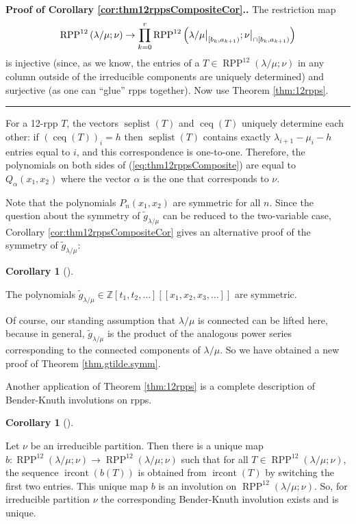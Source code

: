 \documentclass[numbers=enddot,12pt,final,onecolumn,notitlepage]{scrartcl}%
\theoremstyle{definition}
\newtheorem{coro}[theo]{Corollary}
\newenvironment{corollary}[1][]
{\begin{coro}[#1]\begin{leftbar}}
{\end{leftbar}\end{coro}}
\newenvironment{proof}[1][Proof]{\noindent\textbf{#1.} }{\ \rule{0.5em}{0.5em}}
\newcommand{\kk}{\mathbf{k}}
\let\prodnonlimits\prod
\renewcommand{\prod}{\prodnonlimits\limits}
\def\seplist{{\operatorname{seplist}}} %
\def\ceq{{\operatorname{ceq}}}
\def\ircont{{\operatorname{ircont}}}
\def\ceqvar{{{\alpha}}} %
\def\seplistvar{{{\nu}}} %
\def\g{{\widetilde{g}}}
\def\lm{{\lambda/\mu}}
\def\Z{{\mathbb{Z}}}
\def\OneTwoRPPCutvar{{\operatorname{RPP}^{12}\left(  \lambda/\mu ;\seplistvar \right)}}
\begin{document}
\begin{proof}[Proof of Corollary \ref{cor:thm12rppsCompositeCor}.] The restriction map
\[
\OneTwoRPPCutvar \to \prod_{k=0}^r \operatorname{RPP}^{12}\left( \lm\big|_{[b_k,a_{k+1})} ; \nuxycap{b_k}{a_{k+1}}\right)
\]
is injective (since, as we know, the entries of a $T \in \OneTwoRPPCutvar$ in any column outside of the irreducible components are uniquely determined) and surjective (as one can ``glue'' rpps together).
Now use Theorem \ref{thm:12rpps}.
\end{proof}

 For a 12-rpp $T$, the vectors $\seplist(T)$ and $\ceq(T)$ uniquely determine each other: if $(\ceq(T))_i=h$ then $\seplist(T)$ contains exactly $\lambda_{i+1}-\mu_i-h$ entries equal to $i$, and this correspondence is one-to-one. Therefore, the polynomials on both sides of (\ref{eq:thm12rppsComposite}) are equal to $Q_{\ceqvar}(x_1,x_2)$ where the vector $\ceqvar$ is the one that corresponds to $\seplistvar$.

 Note that the polynomials $P_n(x_1,x_2)$ are symmetric for all $n$. Since the question about the symmetry of $\g_\lm$ can be reduced to the two-variable case, Corollary \ref{cor:thm12rppsCompositeCor} gives an alternative proof of the symmetry of $\g_\lm$:
\begin{corollary}
 The polynomials $\g_\lm \in \Z[t_1,t_2,\dots]\left[[x_1, x_2, x_3, \ldots]\right]$ are symmetric.
\end{corollary}
 
 Of course, our standing assumption that $\lm$ is connected can be lifted here, because in general, $\g_\lm$ is the product of the analogous power series corresponding to the connected components of $\lm$. So we have obtained a new proof of Theorem \ref{thm.gtilde.symm}.
 

Another application of Theorem \ref{thm:12rpps} is a complete description of Bender-Knuth involutions on rpps.

\begin{corollary}
\label{cor:uniqueBK}
Let $\seplistvar$ be an irreducible partition. Then there is a unique map $b:\OneTwoRPPCutvar\to\OneTwoRPPCutvar$ such that for all $T\in\OneTwoRPPCutvar$, the sequence $\ircont(b(T))$ is obtained from $\ircont(T)$ by switching the first two entries.
This unique map $b$ is an involution on $\OneTwoRPPCutvar$. So, for irreducible partition $\seplistvar$ the corresponding Bender-Knuth involution exists and is unique.
\end{corollary}
\end{document}
